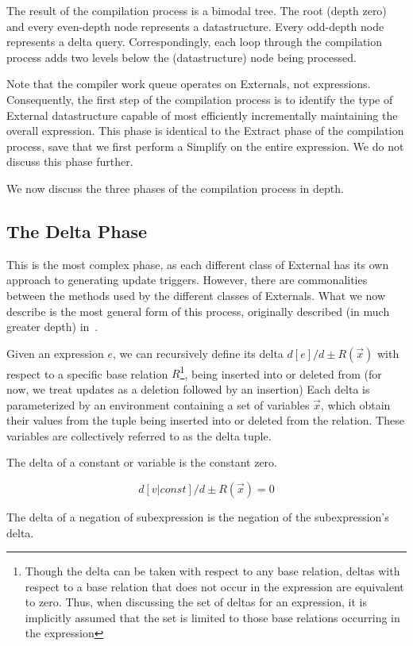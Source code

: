 \documentclass[11pt]{amsart}
\newcommand{\parsection}[1]{\smallskip\noindent{\bf #1.}}
\begin{document}
The result of the compilation process is a bimodal tree.  The root (depth zero) and every even-depth node represents a datastructure.  Every odd-depth node represents a delta query.  Correspondingly, each loop through the compilation process adds two levels below the (datastructure) node being processed.

Note that the compiler work queue operates on Externals, not expressions.  Consequently, the first step of the compilation process is to identify the type of External datastructure capable of most efficiently incrementally maintaining the overall expression.  This phase is identical to the Extract phase of the compilation process, save that we first perform a Simplify on the entire expression.  We do not discuss this phase further.

We now discuss the three phases of the compilation process in depth.
\subsection{The Delta Phase}
This is the most complex phase, as each different class of External has its own approach to generating update triggers.  However, there are commonalities between the methods used by the different classes of Externals.  What we now describe is the most general form of this process, originally described (in much greater depth) in~\cite{dbt-pods}.  

Given an expression $e$, we can recursively define its delta $d[e]/d\pm R(\vec x)$ with respect to a specific base relation $R$\footnote{Though the delta can be taken with respect to any base relation, deltas with respect to a base relation that does not occur in the expression are equivalent to zero.  Thus, when discussing the set of deltas for an expression, it is implicitly assumed that the set is limited to those base relations occurring in the expression}, being inserted into or deleted from (for now, we treat updates as a deletion followed by an insertion)  Each delta is parameterized by an environment containing a set of variables $\vec x$, which obtain their values from the tuple being inserted into or deleted from the relation.  These variables are collectively referred to as the delta tuple.

\parsection{Constant, Variable}  The delta of a constant or variable is the constant zero.

$$d[v|const]/d\pm R(\vec x) = 0$$

\parsection{Negation}  The delta of a negation of subexpression is the negation of the subexpression's delta.
\end{document}
